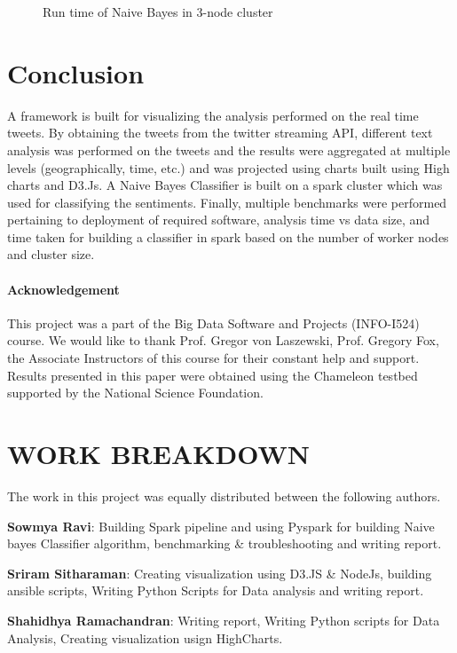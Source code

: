 \documentclass[9pt,twocolumn,twoside]{../../styles/osajnl}
\begin{document}
\begin{figure}[htbp]
\centering
{}
\caption{Run time of Naive Bayes in 3-node cluster}
\label{fig:chamstat3}
\end{figure}


\section{Conclusion}
A framework is  built for visualizing the analysis performed on the real time tweets. By obtaining the tweets from the twitter streaming API, different text analysis was performed on the tweets and the results were aggregated at multiple levels (geographically, time, etc.) and was projected using charts built using High charts and D3.Js. A Naive Bayes Classifier is built on a spark cluster which was used for classifying the sentiments. Finally, multiple benchmarks were performed pertaining to deployment of required software, analysis time vs data size, and time taken for building a classifier in spark based on the number of worker nodes and cluster size.

\paragraph{Acknowledgement}

This project was a part of the Big Data Software and Projects (INFO-I524) course. We would
like to thank Prof. Gregor von Laszewski, Prof. Gregory Fox, the
Associate Instructors of this course for their constant help and support. Results presented in
this paper were obtained using the Chameleon testbed supported by the
National Science Foundation.

\section{WORK BREAKDOWN}
	The work in this project was equally distributed between the following authors.
	
	\textbf{Sowmya Ravi}: Building Spark pipeline and using Pyspark for building Naive bayes Classifier algorithm, benchmarking \& troubleshooting and writing report.
	
	\textbf{Sriram Sitharaman}: Creating visualization using D3.JS \& NodeJs, building ansible scripts, Writing Python Scripts for Data analysis and writing report.
	
	\textbf{Shahidhya Ramachandran}: Writing report, Writing Python scripts for Data Analysis, Creating visualization usign HighCharts. 
	

\end{document}
